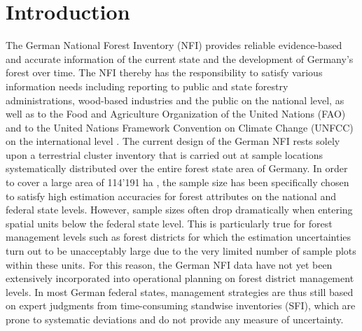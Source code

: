 \documentclass[remotesensing,article,submit,moreauthors,pdftex,10pt,a4paper]{mdpi}
\begin{document}



\section{Introduction}
\label{sec:intro}

The German National Forest Inventory (NFI) provides reliable evidence-based and accurate information of the current state and the development of Germany's forest over time. The NFI thereby has the responsibility to satisfy various information needs including reporting to public and state forestry administrations, wood-based industries and the public on the national level, as well as to the Food and Agriculture Organization of the United Nations (FAO) and to the United Nations Framework Convention on Climate Change (UNFCC) on the international level \citep{polley2010intomppo}. The current design of the German NFI rests solely upon a terrestrial cluster inventory that is carried out at sample locations systematically distributed over the entire forest state area of Germany. In order to cover a large area of 114'191 ha \citep{bwi3}, the sample size has been specifically chosen to satisfy high estimation accuracies for forest attributes on the national and federal state levels. However, sample sizes often drop dramatically when entering spatial units below the federal state level. This is particularly true for forest management levels such as forest districts for which the estimation uncertainties turn out to be unacceptably large due to the very limited number of sample plots within these units. For this reason, the German NFI data have not yet been extensively incorporated into operational planning on forest district management levels. In most German federal states, management strategies are thus still based on expert judgments from time-consuming standwise inventories (SFI), which are prone to systematic deviations \cite{kulievsis2016} and do not provide any measure of uncertainty.\par
\end{document}
